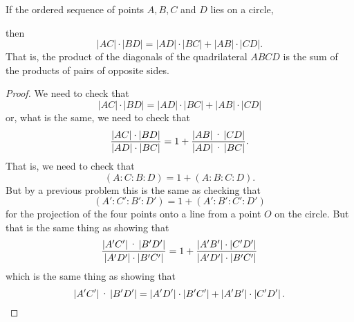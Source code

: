 \documentclass{ximera}
\begin{document}
\begin{theorem}[Ptolemy] If the ordered sequence of points $A,B,C$ and $D$ lies on a circle,
\begin{image}
\end{image}
then%
\[
\left\vert AC\right\vert \cdot\left\vert BD\right\vert
=\left\vert AD\right\vert \cdot\left\vert BC\right\vert
+\left\vert AB\right\vert \cdot\left\vert CD\right\vert
.
\]
That is, the product of the diagonals of the quadrilateral $ABCD$ is the sum
of the products of pairs of opposite sides.
\end{theorem}

\begin{proof}
We need to check that%
\[
\left\vert AC\right\vert \cdot\left\vert BD\right\vert
=\left\vert AD\right\vert \cdot\left\vert BC\right\vert
+\left\vert AB\right\vert \cdot\left\vert CD\right\vert
\]
or, what is the same, we need to check that%
\[
\frac{\left\vert AC\right\vert \cdot\left\vert
BD\right\vert }{\left\vert AD\right\vert \cdot\left\vert
BC\right\vert }=1+\frac{\left\vert AB\right\vert \text{\textperiodcentered
}\left\vert CD\right\vert }{\left\vert AD\right\vert \text{\textperiodcentered
}\left\vert BC\right\vert }.
\]
That is, we need to check that
\[
\left(  A:C:B:D\right)  =1+\left(  A:B:C:D\right)  .
\]
But by a previous problem this is the same as checking that%
\[
\left(  A':C':B':D'\right)  =1+\left(
A':B':C':D'\right)
\]
for the projection of the four points onto a line from a point $O$ on the
circle. But that is the same thing as showing that
\[
\frac{\left\vert A'C'\right\vert \text{\textperiodcentered
}\left\vert B'D'\right\vert }{\left\vert A'D^{\prime
}\right\vert \cdot\left\vert B'C^{\prime
}\right\vert }=1+\frac{\left\vert A'B'\right\vert
\cdot\left\vert C'D'\right\vert
}{\left\vert A'D'\right\vert \cdot \left\vert B'C'\right\vert }%
\]
which is the same thing as showing that%
\[
\left\vert A'C'\right\vert \text{\textperiodcentered
}\left\vert B'D'\right\vert =\left\vert A'D^{\prime
}\right\vert \cdot\left\vert B'C^{\prime
}\right\vert +\left\vert A'B'\right\vert
\cdot\left\vert C'D'\right\vert .
\]
\end{proof}
\end{document}
